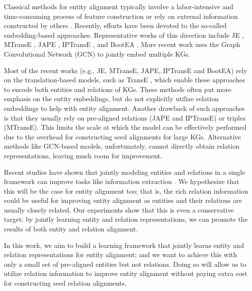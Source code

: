 \documentclass[11pt,a4paper]{article}
\begin{document}
Classical methods for entity alignment typically involve a labor-intensive and time-consuming process of feature construction
\cite{mahdisoltani2013yago3} or rely on external information constructed by others \cite{Suchanek:2011:PPA:2078331.2078332}. Recently, efforts have been devoted to
the so-called embedding-based approaches. Representative works of this direction include JE \cite{hao2016joint}, MTransE
\cite{chen2016multilingual}, JAPE \cite{sun2017cross}, IPTransE \cite{zhu2017iterative}, and BootEA \cite{ijcai2018-611}. More recent work
\cite{D18-1032} uses the Graph Convolutional Network (GCN) \cite{Kipf2016Semi} to jointly embed multiple KGs.

Most of the recent works (e.g., JE, MTransE, JAPE, IPTransE and BootEA) rely on the translation-based models, such as TransE
\cite{bordes2013translating}, 
which enable these approaches to encode both entities and relations of KGs. These methods often put more emphasis on the entity embeddings, but do not explicitly utilize relation embeddings to help with entity alignment. Another
drawback of such approaches is that they usually rely on pre-aligned relations (JAPE and IPTransE) or triples (MTransE). This limits the
scale at which the model can be effectively performed due to the overhead for constructing seed alignments for large KGs. Alternative
methods like GCN-based models, unfortunately, cannot directly obtain relation representations, leaving much room for improvement.


Recent studies have shown that jointly modeling entities and relations in a single framework can improve tasks like information extraction
\cite{miwa-bansal-2016-end,bekoulis-etal-2018-adversarial}. We hypothesize that this will be the case for entity alignment too; that is,
the rich relation information could be useful for improving entity alignment as entities and their relations are usually
closely related. Our experiments show that this is even a conservative target: by jointly learning entity and relation representations,
we can promote the results of both entity and relation alignment.

In this work, we aim to build a learning framework that jointly learns entity and relation representations for entity alignment; and we
want to achieve this with only a small set of pre-aligned entities but not relations. Doing so will allow us to utilize relation information
to improve entity alignment without paying extra cost for constructing seed relation alignments.
\end{document}
